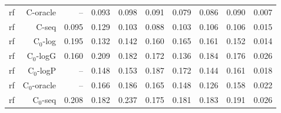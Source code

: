 \begin{table}[htbp]
\begin{tabular}{lrrrrrrrrr}
rf & C-oracle & -- & 0.093 & 0.098 & 0.091 & 0.079 & 0.086 & 0.090 & 0.007 \\
rf & C-seq & 0.095 & 0.129 & 0.103 & 0.088 & 0.103 & 0.106 & 0.106 & 0.015 \\
rf & C$_0$-log & 0.195 & 0.132 & 0.142 & 0.160 & 0.165 & 0.161 & 0.152 & 0.014 \\
rf & C$_0$-logG & 0.160 & 0.209 & 0.182 & 0.172 & 0.136 & 0.184 & 0.176 & 0.026 \\
rf & C$_0$-logP & -- & 0.148 & 0.153 & 0.187 & 0.172 & 0.144 & 0.161 & 0.018 \\
rf & C$_0$-oracle & -- & 0.166 & 0.186 & 0.165 & 0.148 & 0.126 & 0.158 & 0.022 \\
rf & C$_0$-seq & 0.208 & 0.182 & 0.237 & 0.175 & 0.181 & 0.183 & 0.191 & 0.026 \\
\bottomrule
\end{tabular}
\end{table}
